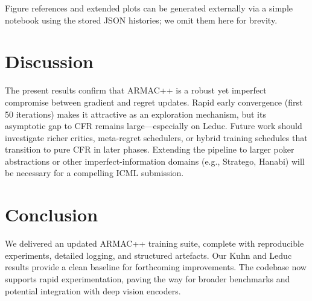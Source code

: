 \documentclass[11pt]{article}
\begin{document}
Figure references and extended plots can be generated externally via a simple notebook using the stored JSON histories; we omit them here for brevity.

\section{Discussion}
The present results confirm that ARMAC++ is a robust yet imperfect compromise between gradient and regret updates. Rapid early convergence (first 50 iterations) makes it attractive as an exploration mechanism, but its asymptotic gap to CFR remains large—especially on Leduc. Future work should investigate richer critics, meta-regret schedulers, or hybrid training schedules that transition to pure CFR in later phases. Extending the pipeline to larger poker abstractions or other imperfect-information domains (e.g., Stratego, Hanabi) will be necessary for a compelling ICML submission.

\section{Conclusion}
We delivered an updated ARMAC++ training suite, complete with reproducible experiments, detailed logging, and structured artefacts. Our Kuhn and Leduc results provide a clean baseline for forthcoming improvements. The codebase now supports rapid experimentation, paving the way for broader benchmarks and potential integration with deep vision encoders.
\end{document}
